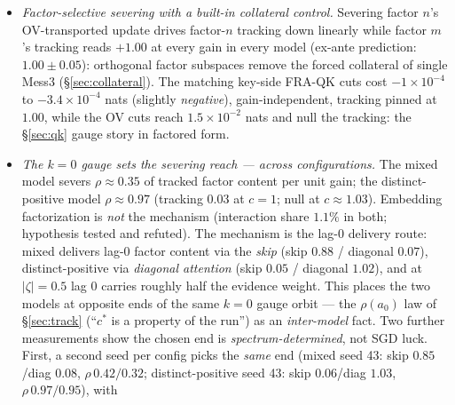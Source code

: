 \documentclass{article}
\begin{document}
\begin{itemize}
Conversely, the $H{=}1$ mixed model bounds $H_{\min}$ from below: with a single head its
RB gap plateaus at $4.9\times10^{-4}$ nats ($2.8\times$ the $H{=}2$ gap) and the shared
$\alpha$ kernel \emph{truncates at lag 1} (lag-2/lag-1 ratio $8\times10^{-4}$ for both
factors) --- a single head gives the two factors' transported coefficients a
lag-independent ratio $\gamma_2/\gamma_1$, whereas the target ratio
$(-0.5)^\tau/(0.5)^\tau=(-1)^\tau$ alternates in sign with lag, so only one lag can be
served exactly; training keeps the dominant lag-1 evidence and zeroes the
tail.\footnote{\texttt{out/P1mix1/analyze.json}: \texttt{gap\_to\_bayes}
$4.93\times10^{-4}$, \texttt{ratio\_lag2\_over\_lag1} ${\approx}8\times10^{-4}$ for both
factors.}
\item \emph{Factor-selective severing with a built-in collateral control.}
Severing factor $n$'s OV-transported update drives factor-$n$ tracking down
linearly while factor $m$'s tracking reads $+1.00$ at every gain in every model
(ex-ante prediction: $1.00\pm0.05$): orthogonal factor subspaces remove the
forced collateral of single Mess3 (\S\ref{sec:collateral}). The matching key-side
FRA-QK cuts cost $-1\times10^{-4}$ to $-3.4\times10^{-4}$ nats (slightly
\emph{negative}), gain-independent, tracking pinned at $1.00$, while the OV cuts
reach $1.5\times10^{-2}$ nats and null the tracking: the \S\ref{sec:qk} gauge
story in factored form.
\item \emph{The $k{=}0$ gauge sets the severing reach --- across
configurations.} The mixed model severs $\rho\approx0.35$ of tracked factor
content per unit gain; the distinct-positive model $\rho\approx0.97$ (tracking
$0.03$ at $c{=}1$; null at $c\approx1.03$). Embedding factorization is
\emph{not} the mechanism (interaction share $1.1\%$ in both; hypothesis tested
and refuted). The mechanism is the lag-0 delivery route: mixed delivers lag-0
factor content via the \emph{skip} (skip $0.88$ / diagonal $0.07$),
distinct-positive via \emph{diagonal attention} (skip $0.05$ / diagonal
$1.02$), and at $|\zeta|=0.5$ lag 0 carries roughly half the evidence weight.
This places the two models at opposite ends of the same $k{=}0$ gauge orbit --- the
$\rho(a_0)$ law of \S\ref{sec:track} (``$c^\ast$ is a property of the run'') as an
\emph{inter-model} fact. Two further measurements show the chosen end is
\emph{spectrum-determined}, not SGD luck. First, a second seed per config picks the
\emph{same} end (mixed seed 43: skip $0.85$/diag $0.08$, $\rho\,0.42/0.32$;
distinct-positive seed 43: skip $0.06$/diag $1.03$, $\rho\,0.97/0.95$), with

\end{itemize}
\end{document}
